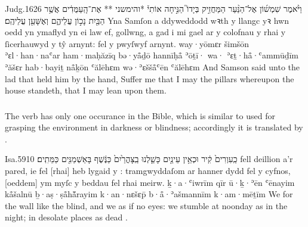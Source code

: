 \begin{example}{Judg.}{16}{26}{}{}
	\quoling
	{וַיֹּ֨אמֶר שִׁמְשׁ֜וֹן אֶל־הַנַּ֨עַר הַמַּחֲזִ֣יק בְּיָדוֹ֮ הַנִּ֣יחָה אוֹתִי֒ *והימשני ** אֶת־הָֽעַמֻּדִ֔ים אֲשֶׁ֥ר הַבַּ֖יִת נָכ֣וֹן עֲלֵיהֶ֑ם וְאֶשָּׁעֵ֖ן עֲלֵיהֶֽם׃}
	{Yna Samſon a ddyweddodd wꝛth y llangc yꝛ hwn oedd yn ymaflyd yn ei law ef, gollwng, a gad i mi gael  ar y colofnau y rhai y ſicerhauwyd y tŷ arnynt: fel y pwyſwyf arnynt.}
	{way·yōmɛr šimšōn ʾɛl·han·naʿar ham·maḥăzīq bə·yå̄ḏō hannīḥå̄ ʾōṯī· wa· ʾɛṯ·hå̄·ʿammūḏīm ʾăšɛr hab·bayiṯ nå̄ḵōn ʿălēhɛm wə·ʾɛššå̄ʿēn ʿălēhɛm}
	{And Samson said unto the lad that held him by the hand, Suffer me that I may  the pillars whereupon the house standeth, that I may lean upon them.}
\end{example}



\subsubsection{}

\begin{paper}
	The verb  has only one occurance in the Bible, which is similar to  used for grasping the environment in darkness or blindness; accordingly it is translated by .
\end{paper}

\begin{example}{Isa.}{59}{10}{}{}
	\quoling
	{ כַֽעִוְרִים֙ קִ֔יר וּכְאֵ֥ין עֵינַ֖יִם  כָּשַׁ֤לְנוּ בַֽצָּהֳרַ֙יִם֙ כַּנֶּ֔שֶׁף בָּאַשְׁמַנִּ֖ים כַּמֵּתִֽים׃}
	{ fell deillion a’r pared, ie fel [rhai] heb lygaid y  : tramgwyddaſom ar hanner dydd fel y cyfnos, [oeddem] ym myſc y beddau fel rhai meirw.}
	{ ḵ·a·ʿiwrīm qīr ū·ḵ·ʾēn ʿēnayim  kå̄šalnū ḇ·aṣ·ṣå̄hå̄̆rayim k·an·nɛšɛp̄ b·å̄·ʾašmannīm k·am·mēṯīm}
	{We  for the wall like the blind, and we  as if  no eyes: we stumble at noonday as in the night;  in desolate places as dead .}
\end{example}



\subsubsection{}

